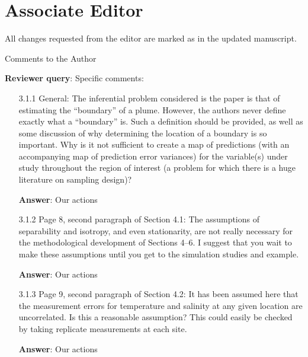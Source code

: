 \documentclass[a4paper]{article}
\def\reply{\textbf{Reviewer query}}
\def\action{\textbf{Answer}}
\newcommand{\edcomment}[1]{{\color{green}{\{Editor: #1\}}}}
\begin{document}
 \section*{Associate Editor}
All changes requested from the editor are marked as \edcomment{green text}
in the updated manuscript. 

\begin{answers}

\item{Comments to the Author}\label{q30}

\reply: Specific comments:

\begin{itemize}[noitemsep,topsep=0pt,parsep=0pt,partopsep=0pt]

\item[3.1.1] General: The inferential problem considered is the paper is that of estimating the “boundary”
of a plume. However, the authors never define exactly what a “boundary” is. Such a definition
should be provided, as well as some discussion of why determining the location of a boundary
is so important. Why is it not sufficient to create a map of predictions (with an accompanying
map of prediction error variances) for the variable(s) under study throughout the region of
interest (a problem for which there is a huge literature on sampling design)?\par
\action: Our actions
\vspace{1em}

\item[3.1.2] Page 8, second paragraph of Section 4.1: The assumptions of separability and isotropy, and even stationarity, are not really necessary for the methodological development of Sections 4–6.
I suggest that you wait to make these assumptions until you get to the simulation studies and
example.\par
\action: Our actions
\vspace{1em}

\item[3.1.3] Page 9, second paragraph of Section 4.2: It has been assumed here that the measurement
errors for temperature and salinity at any given location are uncorrelated. Is this a reasonable
assumption? This could easily be checked by taking replicate measurements at each site.\par
\action: Our actions
\vspace{1em}


\end{itemize}
\end{answers}
\end{document}

